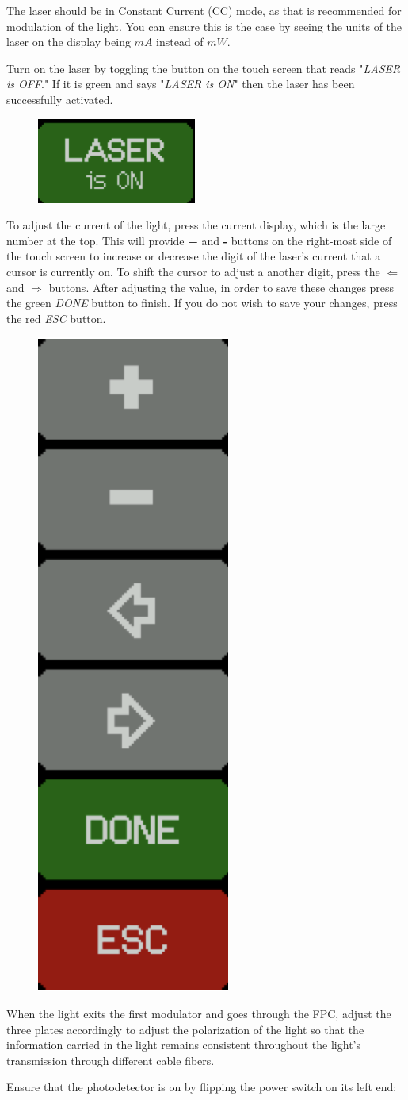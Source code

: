 \documentclass[11pt]{article}
\begin{document}
The laser should be in Constant Current (CC) mode, as that is recommended for modulation of the light. You can ensure this is the case by seeing the units of the laser on the display being $mA$ instead of $mW$.

Turn on the laser by toggling the button on the touch screen that reads "\textit{LASER is OFF}." If it is green and says "\textit{LASER is ON}" then the laser has been successfully activated.

\begin{figure}[H]
    \centering
    \includegraphics[width=0.1\linewidth]{laseron.png}
    \label{fig:enter-label}
\end{figure}

To adjust the current of the light, press the current display, which is the large number at the top. This will provide \textbf{+} and \textbf{-} buttons on the right-most side of the touch screen to increase or decrease the digit of the laser's current that a cursor is currently on. To shift the cursor to adjust a another digit, press the $\Leftarrow$ and $\Rightarrow$ buttons. After adjusting the value, in order to save these changes press the green \textit{DONE} button to finish. If you do not wish to save your changes, press the red \textit{ESC} button.

\begin{figure}[H]
    \centering
    \includegraphics[width=0.1\linewidth]{buttons.png}
    \label{fig:enter-label}
\end{figure}

When the light exits the first modulator and goes through the FPC, adjust the three plates accordingly to adjust the polarization of the light so that the information carried in the light remains consistent throughout the light's transmission through different cable fibers.

Ensure that the photodetector is on by flipping the power switch on its left end:
\end{document}
